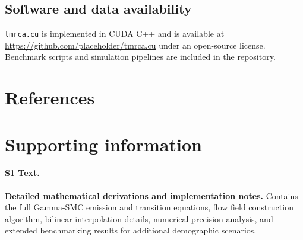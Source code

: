 \documentclass[10pt,letterpaper]{article}
\begin{document}
\subsection*{Software and data availability}

\texttt{tmrca.cu} is implemented in CUDA C++ and is available at \url{https://github.com/placeholder/tmrca.cu} under an open-source license.
Benchmark scripts and simulation pipelines are included in the repository.

\section*{References}




\section*{Supporting information}

\paragraph*{S1 Text.}
\label{S1_Text}
{\bf Detailed mathematical derivations and implementation notes.}
Contains the full Gamma-SMC emission and transition equations, flow field construction algorithm, bilinear interpolation details, numerical precision analysis, and extended benchmarking results for additional demographic scenarios.
\end{document}
